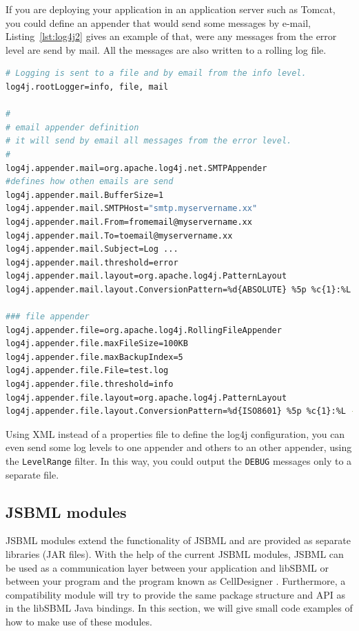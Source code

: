 If you are deploying your application in an application server such as Tomcat,
you could define an appender that would send some messages by e-mail,
Listing~\vref{lst:log4j2} gives an example of that, were any messages from the
error level
%
are send by mail. All the messages are also written to a rolling log
file.
\begin{lstlisting}[language=bash,%numbers=none,
caption={SMTPAppender log4j example.}, label=lst:log4j2]
# Logging is sent to a file and by email from the info level.
log4j.rootLogger=info, file, mail

#
# email appender definition
# it will send by email all messages from the error level.
#
log4j.appender.mail=org.apache.log4j.net.SMTPAppender
#defines how othen emails are send
log4j.appender.mail.BufferSize=1
log4j.appender.mail.SMTPHost="smtp.myservername.xx"
log4j.appender.mail.From=fromemail@myservername.xx
log4j.appender.mail.To=toemail@myservername.xx
log4j.appender.mail.Subject=Log ...
log4j.appender.mail.threshold=error
log4j.appender.mail.layout=org.apache.log4j.PatternLayout
log4j.appender.mail.layout.ConversionPattern=%d{ABSOLUTE} %5p %c{1}:%L - %m%n

### file appender
log4j.appender.file=org.apache.log4j.RollingFileAppender
log4j.appender.file.maxFileSize=100KB
log4j.appender.file.maxBackupIndex=5
log4j.appender.file.File=test.log
log4j.appender.file.threshold=info
log4j.appender.file.layout=org.apache.log4j.PatternLayout
log4j.appender.file.layout.ConversionPattern=%d{ISO8601} %5p %c{1}:%L - %m%n
\end{lstlisting}

Using XML instead of a properties file to define the log4j configuration, you
can even send some log levels
%
to one appender and others to an other appender,
using the \texttt{LevelRange} filter. In this way, you could output the
\texttt{DEBUG} messages only to a separate file.


\subsection{JSBML modules}

JSBML modules extend the functionality of JSBML and are provided as separate
libraries (JAR files). With the help of the current JSBML modules, JSBML can be
used as a communication layer  between your
application and libSBML \citep{Bornstein2008} or between your program and the
program known as CellDesigner \citep{Funahashi2003}. Furthermore, a
compatibility module
%
will try to provide the same package structure and API as in the libSBML Java
bindings. In this section, we will give small code examples of how to make use
of these modules.

